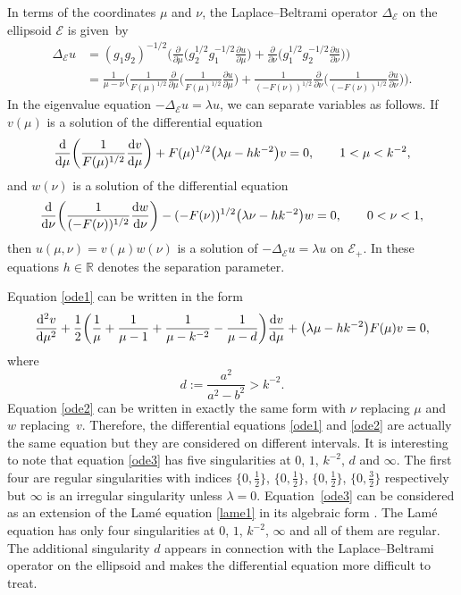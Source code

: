 \documentclass[10pt,a4paper]{amsart}
\newcommand{\R}{\mathbb{R}}
\newcommand{\E}{\mathcal{E}}
\newcommand{\D}{\Delta_\E}
\numberwithin{equation}{section}
\begin{document}
In terms of the coordinates $\mu$ and $\nu$, the Laplace--Beltrami operator $\D$ on the ellipsoid $\E$ is given~by
\begin{align*}
 \D u&{}=(g_1g_2)^{-1/2}\biggl(\frac{\partial}{\partial \mu}\biggl(g_2^{1/2}g_1^{-1/2}
\frac{\partial u}{\partial \mu}\biggr)+\frac{\partial}{\partial \nu}\biggl(g_1^{1/2}g_2^{-1/2}
\frac{\partial u}{\partial \nu}\biggr) \biggr)\\
&{}=\frac1{\mu-\nu}\biggl(\frac{1}{F(\mu)^{1/2}}\frac{\partial}{\partial \mu}\biggl(\frac{1}{F(\mu)^{1/2}}\frac{\partial u}{\partial \mu}
\biggr)
+\frac{1}{(-F(\nu))^{1/2}}\frac{\partial}{\partial \nu}\biggl(\frac{1}{(-F(\nu))^{1/2}}\frac{\partial u}{\partial \nu}\biggr)\biggr).
\end{align*}
In the eigenvalue equation $-\D u=\lambda u$, we can separate variables as follows.
If $v(\mu)$ is a solution of the differential equation
\begin{equation}\label{ode1}
\frac{{\rm d}}{{\rm d}\mu}\biggl(\frac{1}{F(\mu)^{1/2}}\frac{{\rm d}v}{{\rm d}\mu}\biggr)+F(\mu)^{1/2}\bigl(\lambda\mu-hk^{-2}\bigr)v =0,\qquad 1<\mu<k^{-2},
\end{equation}
and $w(\nu)$ is a solution of the differential equation
\begin{equation}\label{ode2}
\frac{{\rm d}}{{\rm d}\nu}\biggl(\frac{1}{(-F(\nu))^{1/2}}\frac{{\rm d}w}{{\rm d}\nu}\biggr)-(-F(\nu))^{1/2}\bigl(\lambda \nu-hk^{-2}\bigr) w =0,\qquad 0<\nu<1,
\end{equation}
then $u(\mu,\nu)=v(\mu)w(\nu)$ is a solution of $-\D u=\lambda u$ on $\E_+$. In these equations $h\in\R$ denotes the separation parameter.

Equation \eqref{ode1} can be written in the form
\begin{equation}\label{ode3}
\frac{{\rm d}^2v}{{\rm d}\mu^2}+\frac12\biggl(\frac1\mu+\frac1{\mu-1}+\frac1{\mu-k^{-2}}-\frac1{\mu-d}\biggr)
\frac{{\rm d}v}{{\rm d}\mu}+\bigl(\lambda \mu-hk^{-2}\bigr)F(\mu) v=0,
\end{equation}
where
\[ d:=\frac{a^2}{a^2-b^2}>k^{-2}.\]
Equation \eqref{ode2} can be written in exactly the same form with $\nu$ replacing $\mu$ and $w$ replacing~$v$.
Therefore, the differential equations \eqref{ode1} and \eqref{ode2} are actually the same equation but they are considered on different intervals.
It is interesting to note that equation \eqref{ode3} has five singularities at $0$, $1$, $k^{-2}$, $d$ and $\infty$.
The first four are regular singularities \cite[Sections~5 and~4]{O} with indices $\{0,\frac12\}$, $\{0,\frac12\}$, $\{0,\frac12\}$, $\{0,\frac32\}$
respectively but $\infty$ is an irregular singularity unless $\lambda=0$. Equation~\eqref{ode3} can be considered as an extension of
the Lam\'e equation \eqref{lame1} in its algebraic form \cite[Section~29.2.2]{dlmf}. The Lam\'e equation has only four singularities at $0$, $1$, $k^{-2}$, $\infty$ and all of them are regular. The additional singularity $d$ appears in connection with the Laplace--Beltrami operator on the ellipsoid and makes the differential equation more difficult to treat.
\end{document}
